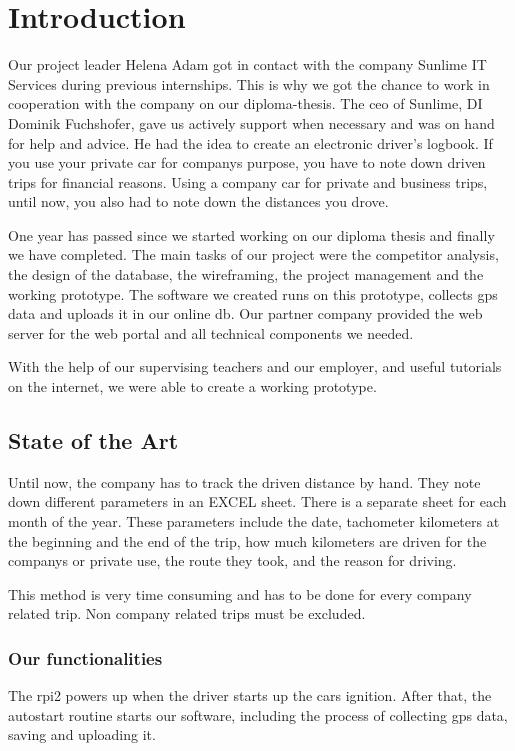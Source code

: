 \chapter*{Introduction}
Our project leader Helena Adam got in contact with the company Sunlime IT Services during previous internships. This is why we got the chance to work in cooperation with the company on our diploma-thesis. The \gls{ceo} of Sunlime, DI Dominik Fuchshofer, gave us actively support when necessary and was on hand for help and advice.
He had the idea to create an electronic driver’s logbook. If you use your private car for companys purpose, you have to note down driven trips for financial reasons. Using a company car for private and business trips, until now, you also had to note down the distances you drove.

One year has passed since we started working on our diploma thesis and finally we have completed. The main tasks of our project were the competitor analysis, the design of the database, the wireframing, the project management and the working prototype. The software we created runs on this prototype, collects \gls{gps} data and uploads it in our online \gls{db}. Our partner company provided the web server for the web portal and all technical components we needed. 

With the help of our supervising teachers and our employer, and useful tutorials on the internet, we were able to create a working prototype.
\clearpageauthor
\newpage
\section*{State of the Art}
Until now, the company has to track the driven distance by hand. They note down different parameters in an EXCEL sheet. There is a separate sheet for each month of the year. These parameters include the date, tachometer kilometers at the beginning and the end of the trip, how much kilometers are driven for the companys or private use, the route they took, and the reason for driving.

This method is very time consuming and has to be done for every company related trip. Non company related trips must be excluded.
\subsection*{Our functionalities}
The \gls{rpi2} powers up when the driver starts up the cars ignition. After that, the autostart routine starts our software, including the process of collecting \gls{gps} data, saving and uploading it.

